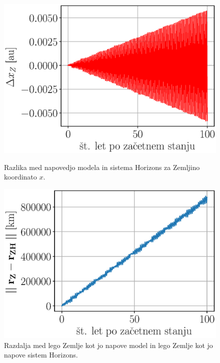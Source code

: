\documentclass[a4paper,12pt]{article}
\begin{document}
\begin{figure}[hb!]
    \centering
    \begin{minipage}[t]{.5\textwidth}
        \centering
        \includegraphics[scale=0.44]{slikep/comparedelta.eps}
        \begin{minipage}{0.85\textwidth}
            \caption{Razlika med napovedjo modela in sistema Horizons za 
            Zemljino koordinato $x$.}
            \label{fig:comparedelta}
        \end{minipage}%
    \end{minipage}%
    \hfill
    \begin{minipage}[t]{.5\textwidth}
        \centering
        \includegraphics[scale=0.44]{slikep/comparedistance.eps}
        \begin{minipage}{0.85\textwidth}
            \caption{Razdalja med lego Zemlje kot jo napove model in lego
            Zemlje kot jo napove sistem Horizons.}
            \label{fig:comparedistance}
        \end{minipage}
    \end{minipage}
\end{figure}
\end{document}
